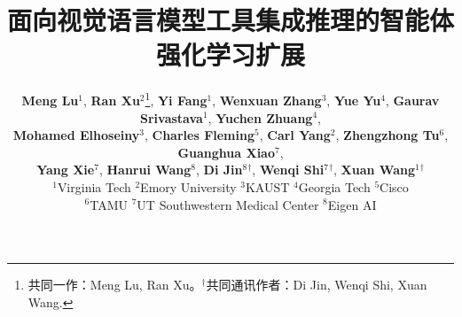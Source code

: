 \documentclass[10pt,twocolumn,letterpaper]{article}
\title{面向视觉语言模型工具集成推理的智能体强化学习扩展}
\author{\textbf{Meng Lu}$^1$\footnotemark[1], \textbf{Ran Xu}$^2$\thanks{共同一作：Meng Lu, Ran Xu。$^\dag$共同通讯作者：Di Jin, Wenqi Shi, Xuan Wang.}, \textbf{Yi Fang}$^1$, \textbf{Wenxuan Zhang}$^3$, \textbf{Yue Yu}$^4$, \textbf{Gaurav Srivastava}$^1$, \textbf{Yuchen Zhuang}$^4$,\\
\textbf{Mohamed Elhoseiny}$^3$, \textbf{Charles Fleming}$^5$, \textbf{Carl Yang}$^2$, \textbf{Zhengzhong Tu}$^6$, \textbf{Guanghua Xiao}$^7$,\\
\textbf{Yang Xie}$^7$, \textbf{Hanrui Wang}$^8$, \textbf{Di Jin}$^8$$^\dag$, \textbf{Wenqi Shi}$^7$$^\dag$, \textbf{Xuan Wang}$^1$$^\dag$\\
$^1$Virginia Tech $^2$Emory University $^3$KAUST $^4$Georgia Tech $^5$Cisco \\
$^6$TAMU $^7$UT Southwestern Medical Center $^8$Eigen AI\\
}
\begin{document}
\maketitle







{
    \small
    
    
}

\appendix

\end{document}
